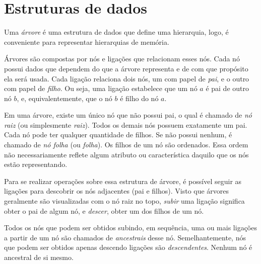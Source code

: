 \section{Estruturas de dados}


Uma \textit{árvore} é uma estrutura de dados que define uma hierarquia, logo, é conveniente para representar hierarquias de memória.

Árvores são compostas por nós e ligações que relacionam esses nós.
Cada nó possui dados que dependem do que a árvore representa e de com que propósito ela será usada.
Cada ligação relaciona dois nós, um com papel de \textit{pai}, e o outro com papel de \textit{filho}.
Ou seja, uma ligação estabelece que um nó $a$ é pai de outro nó $b$, e, equivalentemente, que o nó $b$ é filho do nó $a$.

Em uma árvore, existe um único nó que não possui pai, o qual é chamado de \textit{nó raiz} (ou simplesmente \textit{raiz}).
Todos os demais nós possuem exatamente um pai.
Cada nó pode ter qualquer quantidade de filhos.
Se não possui nenhum, é chamado de \textit{nó folha} (ou \textit{folha}). %
Os filhos de um nó são ordenados.
Essa ordem não necessariamente reflete algum atributo ou característica daquilo que os nós estão representando.

Para se realizar operações sobre essa estrutura de árvore, é possível seguir as ligações para descobrir os nós adjacentes (pai e filhos).
Visto que árvores geralmente são visualizadas com o nó raiz no topo, \textit{subir} uma ligação significa obter o pai de algum nó, e \textit{descer}, obter um dos filhos de um nó.

Todos os nós que podem ser obtidos subindo, em sequência, uma ou mais ligações a partir de um nó são chamados de \textit{ancestrais} desse nó.
Semelhantemente, nós que podem ser obtidos apenas descendo ligações são \textit{descendentes}.
Nenhum nó é ancestral de si mesmo.

